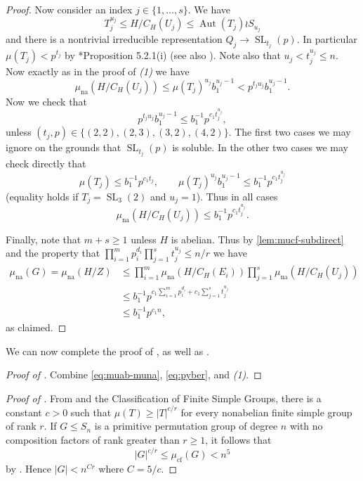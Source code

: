 \documentclass[11pt,reqno]{amsart}
\numberwithin{equation}{section}
\theoremstyle{definition}
\theoremstyle{remark}
\newcommand\opr[1]{\operatorname{#1}}
\def\SL{\opr{SL}}
\def\Aut{\opr{Aut}}
\def\mucf{\mu_{\opr{cf}}}
\def\muna{\mu_{\opr{na}}}
\numberwithin{equation}{section}
\begin{document}
\begin{proof}
    Now consider an index $j \in \{1, \dots, s\}$.
    We have
    \[
        T_j^{u_j}\le H/C_H(U_j)\le \Aut(T_j)\wr S_{u_j}
    \]
    and there is a nontrivial irreducible representation
    \(
        Q_j \to \SL_{t_j}(p).
    \)
    In particular $\mu(T_j) < p^{t_j}$ by \cite{kleidman--liebeck}*{Proposition 5.2.1(i)} (see also ).
    Note also that $u_j < t_j^{u_j} \le n$.
    Now exactly as in the proof of \emph{(1)} we have
    \[
        \muna(H / C_H(U_j))
        \le \mu(T_j)^{u_j} b_1^{u_j-1}
        < p^{t_j u_j} b_1^{u_j - 1}.
    \]
    Now we check that
    \[
        p^{t_j u_j} b_1^{u_j - 1} \le b_1^{-1} p^{c_1 t_j^{u_j}},
    \]
    unless $(t_j, p) \in \{(2, 2), (2, 3), (3, 2), (4, 2)\}$.
    The first two cases we may ignore on the grounds that $\SL_{t_j}(p)$ is soluble.
    In the other two cases we may check directly that
    \[
        \mu(T_j) \le b_1^{-1} p^{c_1 t_j}, \qquad \mu(T_j)^{u_j} b_1^{u_j-1} \le b_1^{-1} p^{c_1 t_j^{u_j}}
    \]
    (equality holds if $T_j = \SL_3(2)$ and $u_j = 1$).
    Thus in all cases
    \[
        \muna(H / C_H(U_j)) \le b_1^{-1} p^{c_1 t_j^{u_j}}.
    \]

    Finally, note that $m + s \ge 1$ unless $H$ is abelian.
    Thus by \cref{lem:mucf-subdirect} and the property that $\prod_{i=1}^m p_i^{d_i} \prod_{j=1}^s t_j^{u_j} \le n/r$ we have
    \begin{align*}
        \muna(G) = \muna(H / Z)
        &\le \prod_{i=1}^m \muna(H / C_H(E_i)) \prod_{j=1}^s \muna(H / C_H(U_j))
        \\
        &\le b_1^{-1} p^{c_1 \sum_{i=1}^m p_i^{d_i} + c_1 \sum_{j=1}^s t_j^{u_j}}
        \\
        &\le b_1^{-1} p^{c_1 n},
    \end{align*}
    as claimed.
\end{proof}

We can now complete the proof of , as well as .

\begin{proof}[Proof of ]
    Combine \eqref{eq:muab-muna}, \eqref{eq:pyber}, and \emph{(1)}.
\end{proof}

\begin{proof}[Proof of ]
    From \cite{ls74} and the Classification of Finite Simple Groups, there is a constant $c > 0$ such that $\mu(T) \ge |T|^{c/r}$ for every nonabelian finite simple group of rank $r$.
    If $G \le S_n$ is a primitive permutation group of degree $n$ with no composition factors of rank greater than $r \ge 1$, it follows that
    \[
    |G|^{c/r} \le \mucf(G) < n^5
    \]
    by .
    Hence $|G| < n^{Cr}$ where $C = 5/c$.
\end{proof}
\end{document}

